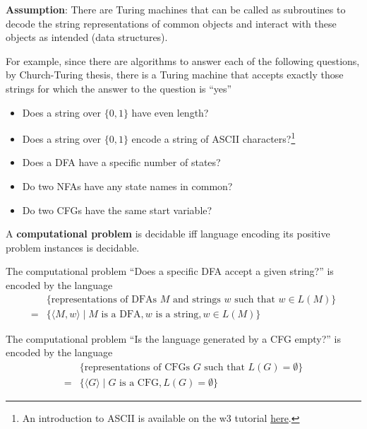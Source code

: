 \documentclass[12pt, oneside]{article}
\begin{document}
    {\bf Assumption}: There are Turing  machines that can be called as subroutines
    to decode the string representations of common objects and  interact with these objects as intended
    (data structures).
    
    \newpage    
    For example, since there are algorithms to answer each of the following questions,
    by Church-Turing thesis, there is a Turing machine that accepts exactly those strings for which the 
    answer to the question is ``yes''
    \begin{itemize}
        \item Does a string over $\{0,1\}$ have even length?

        \vfill

        \item Does a string over $\{0,1\}$ encode a string of ASCII characters?\footnote{An introduction to ASCII 
        is available on the w3 tutorial \href{https://www.w3schools.com/charsets/ref_html_ascii.asp}{here}.}

        \vfill

        \item Does a DFA have a specific number of states?

        \vfill

        \item Do two NFAs have any state names in common?

        \vfill

        \item Do two CFGs have the same start variable?

        \vfill

      \end{itemize}

\newpage

A {\bf computational problem} is decidable iff language encoding its positive problem instances
is decidable.

The computational problem ``Does a specific DFA accept a given string?'' is encoded by the language
\begin{align*}
  &\{ \textrm{representations of DFAs $M$ and strings $w$ such that $w \in L(M)$}\}  \\
  =& \{ \langle M, w \rangle \mid M \textrm{ is a DFA}, w \textrm{ is a string}, w \in L(M) \}
\end{align*}

The computational problem ``Is the language generated by a CFG empty?'' is encoded by the language
\begin{align*}
  &\{ \textrm{representations of CFGs $G$  such that $L(G) = \emptyset$}\}  \\
  =& \{ \langle G \rangle \mid G \textrm{ is a CFG},  L(G) = \emptyset \}
\end{align*}
\end{document}

